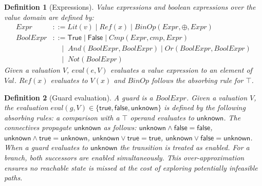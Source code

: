 \documentclass{article}
\newtheorem{definition}{Definition}
\begin{document}
\begin{definition}[Expressions]
\label{def:expressions}
\emph{Value expressions} and \emph{boolean expressions} over the value
domain are defined by:
\begin{align*}
  \mathit{Expr} &::=
    \mathit{Lit}(v) \mid
    \mathit{Ref}(x) \mid
    \mathit{BinOp}(\mathit{Expr},\oplus,\mathit{Expr}) \\[4pt]
  \mathit{BoolExpr} &::=
    \textsf{True} \mid \textsf{False} \mid
    \mathit{Cmp}(\mathit{Expr},\mathit{cmp},\mathit{Expr}) \\
    &\quad\mid\;
    \mathit{And}(\mathit{BoolExpr},\mathit{BoolExpr}) \mid
    \mathit{Or}(\mathit{BoolExpr},\mathit{BoolExpr}) \\
    &\quad\mid\;
    \mathit{Not}(\mathit{BoolExpr})
\end{align*}
Given a valuation $V$, $\mathit{eval}(e,V)$ evaluates a value
expression to an element of $\mathit{Val}$.  $\mathit{Ref}(x)$
evaluates to $V(x)$ and $\mathit{BinOp}$ follows the absorbing rule
for $\top$.
\end{definition}

\begin{definition}[Guard evaluation]
\label{def:guard-eval}
A \emph{guard} is a $\mathit{BoolExpr}$.  Given a valuation $V$, the
evaluation
$\mathit{eval}(g,V)\in\{\mathsf{true},\mathsf{false},\mathsf{unknown}\}$
is defined by the following absorbing rules: a comparison with a $\top$
operand evaluates to $\mathsf{unknown}$.  The connectives propagate
$\mathsf{unknown}$ as follows:
$\mathsf{unknown}\wedge\mathsf{false}=\mathsf{false}$,
$\mathsf{unknown}\wedge\mathsf{true}=\mathsf{unknown}$,
$\mathsf{unknown}\vee\mathsf{true}=\mathsf{true}$,
$\mathsf{unknown}\vee\mathsf{false}=\mathsf{unknown}$.
When a guard evaluates to $\mathsf{unknown}$ the transition is treated
as enabled.  For a branch, both successors are enabled simultaneously.
This over-approximation ensures no reachable state is missed at the
cost of exploring potentially infeasible paths.
\end{definition}
\end{document}
